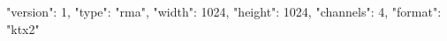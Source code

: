 {
  "version": 1,
  "type": "rma",
  "width": 1024,
  "height": 1024,
  "channels": 4,
  "format": "ktx2"
}
